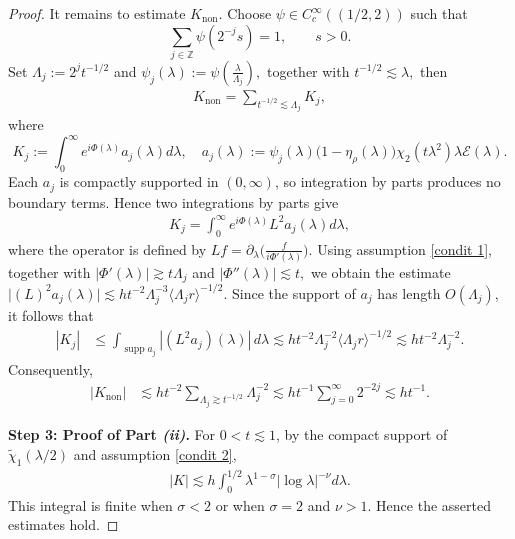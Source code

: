 \documentclass[reqno]{amsart}
\numberwithin{equation}{section}
\begin{document}
\begin{proof}
	It remains to estimate $K_{\mathrm{non}}$. Choose
	$\psi\in C_c^\infty((1/2,2))$ such that
	$$
	\sum_{j\in\mathbb Z}
	\psi(2^{-j}s)
	=
	1,
	\qquad
	s>0.
	$$
	Set
	$
	\Lambda_j
	:=
	2^j t^{-{1}/{2}}
	$ and $
	\psi_j(\lambda)
	:=
	\psi\left(\frac{\lambda}{\Lambda_j}\right),
	$
	together with $t^{-{1}/{2}}\lesssim\lambda,$ then
	\begin{align}\label{K-non}
	K_{\mathrm{non}}
	=
		\sum_{t^{-1/2}\lesssim\Lambda_j}
	K_j,
	\end{align}
	where
	$$
	K_j
	:=
	\int_0^\infty
	e^{i\Phi(\lambda)}
	a_j(\lambda) d\lambda,\quad
	a_j(\lambda)
	:=
	\psi_j(\lambda)
	\bigl(1-\eta_\rho(\lambda)\bigr)
	\chi_2(t\lambda^2)
	\lambda\mathcal E(\lambda).
	$$
	Each $a_j$ is compactly supported in $(0,\infty)$, so integration by
	parts produces no boundary terms.
	Hence two integrations by parts give
	\begin{align}\label{Ij}
	K_j
	=
	\int_0^\infty
	e^{i\Phi(\lambda)}
	L^2a_j(\lambda)d\lambda,
	\end{align}
where the operator is defined by $
Lf
=
\partial_\lambda
\Big(
\frac{f}{i\Phi'(\lambda)}
\Big).
$	
	 	Using assumption \eqref{condit 1}, together with 
	$
	|\Phi'(\lambda)|
	\gtrsim
	t\Lambda_j$
and 
$	|\Phi''(\lambda)|
	\lesssim
	t,
	$
we obtain the estimate
	$
	\big|
	\left(L\right)^2a_j(\lambda)
	\big|
	\lesssim
	h t^{-2}
	\Lambda_j^{-3}
	\langle\Lambda_j r\rangle^{-1/2}.
	$
	Since the support of $a_j$ has length $O(\Lambda_j)$, it follows that
	$$
	\begin{aligned}
		|K_j|
		&\leq
		\int_{\operatorname{supp}a_j}
		\left|
	(L^2a_j)(\lambda)
		\right|
		\,d\lambda\lesssim
		h t^{-2}
		\Lambda_j^{-2}
		\langle\Lambda_j r\rangle^{-1/2}\lesssim
		h t^{-2}
		\Lambda_j^{-2}.
	\end{aligned}
	$$
	Consequently,
	$$
	\begin{aligned}
		|K_{\mathrm{non}}|
		&\lesssim
		h t^{-2}
		\sum_{\Lambda_j\gtrsim t^{-1/2}}
		\Lambda_j^{-2}
	\lesssim
		h t^{-1}
		\sum_{j=0}^{\infty}
	2^{-2j} 
		\lesssim
		ht^{-1}.
	\end{aligned}
	$$
	
	
	
	\textbf{Step 3: Proof of Part \emph{(ii)}.}
	For $0<t\lesssim1$,  by the compact
	support of $\widetilde{\chi}_1(\lambda/2)$ and assumption
	\eqref{condit 2},
	\begin{align}\label{t bound}
	|K|
	\lesssim
	h
	\int_0^{1/2}
	\lambda^{1-\sigma}
	|\log\lambda|^{-\nu} d\lambda.
	\end{align}
	This integral is finite when $\sigma<2$ or when $\sigma=2$ and
	$\nu>1$. Hence the asserted estimates hold.
	

\end{proof}
\end{document}
